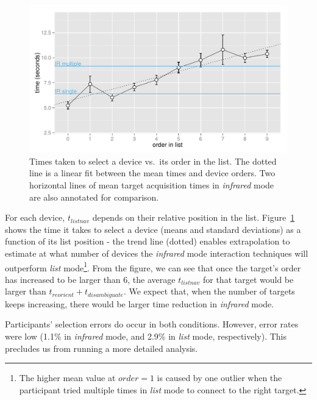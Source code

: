 \begin{figure}[t]
\centering
\includegraphics[width=1.0\columnwidth]{figures/R_List_by_Target.pdf}
\caption{Times taken to select a device vs.~its order in the list. The dotted line is a linear fit between the mean times and device orders. Two horizontal lines of mean target acquisition times in {\em infrared} mode are also annotated for comparison.}
\label{fig:time-vs-list-order}
\end{figure}

For each device, $t_{listnav}$ depends on their relative position in the list. Figure~\ref{fig:time-vs-list-order} shows the time it takes to select a device (means and standard deviations) as a function of its list position - the trend line (dotted) enables extrapolation to estimate at what number of devices the {\em infrared} mode interaction techniques will outperform {\em list} mode\footnote{The higher mean value at $order=1$ is caused by one outlier when the participant tried multiple times in {\em list} mode to connect to the right target.}. From the figure, we can see that once the target's order has increased to be larger than 6, the average $t_{listnav}$ for that target would be larger than $t_{reorient} + t_{disambiguate}$. We expect that, when the number of targets keeps increasing, there would be larger time reduction in {\em infrared} mode.


Participants' selection errors do occur in both conditions. However, error rates were low (1.1\% in {\em infrared} mode, and 2.9\% in {\em list} mode, respectively). This precludes us from running a more detailed analysis. 

